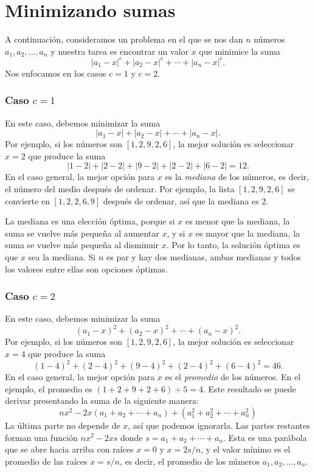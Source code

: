 \section{Minimizando sumas}

A continuación, consideramos un problema en el que
se nos dan $n$ números $a_1,a_2,\ldots,a_n$
y nuestra tarea es encontrar un valor $x$
que minimice la suma
\[|a_1-x|^c+|a_2-x|^c+\cdots+|a_n-x|^c.\]
Nos enfocamos en los casos $c=1$ y $c=2$.

\subsubsection{Caso $c=1$}

En este caso, debemos minimizar la suma
\[|a_1-x|+|a_2-x|+\cdots+|a_n-x|.\]
Por ejemplo, si los números son $[1,2,9,2,6]$,
la mejor solución es seleccionar $x=2$
que produce la suma
\[
  |1-2|+|2-2|+|9-2|+|2-2|+|6-2|=12.
\]
En el caso general, la mejor opción para $x$
es la \textit{mediana} de los números,
es decir, el número del medio después de ordenar.
Por ejemplo, la lista $[1,2,9,2,6]$
se convierte en $[1,2,2,6,9]$ después de ordenar,
así que la mediana es 2.

La mediana es una elección óptima,
porque si $x$ es menor que la mediana,
la suma se vuelve más pequeña al aumentar $x$,
y si $x$ es mayor que la mediana,
la suma se vuelve más pequeña al disminuir $x$.
Por lo tanto, la solución óptima es que $x$
sea la mediana.
Si $n$ es par y hay dos medianas,
ambas medianas y todos los valores entre ellas
son opciones óptimas.

\subsubsection{Caso $c=2$}

En este caso, debemos minimizar la suma
\[(a_1-x)^2+(a_2-x)^2+\cdots+(a_n-x)^2.\]
Por ejemplo, si los números son $[1,2,9,2,6]$,
la mejor solución es seleccionar $x=4$
que produce la suma
\[
  (1-4)^2+(2-4)^2+(9-4)^2+(2-4)^2+(6-4)^2=46.
\]
En el caso general, la mejor opción para $x$
es el \emph{promedio} de los números.
En el ejemplo, el promedio es $(1+2+9+2+6)\div5=4$.
Este resultado se puede derivar presentando
la suma de la siguiente manera:
\[
  nx^2 - 2x(a_1+a_2+\cdots+a_n) + (a_1^2+a_2^2+\cdots+a_n^2)
\]
La última parte no depende de $x$,
así que podemos ignorarla.
Las partes restantes forman una función
$nx^2-2xs$ donde $s=a_1+a_2+\cdots+a_n$.
Esta es una parábola que se abre hacia arriba
con raíces $x=0$ y $x=2s/n$,
y el valor mínimo es el promedio
de las raíces $x=s/n$, es decir,
el promedio de los números $a_1,a_2,\ldots,a_n$.

